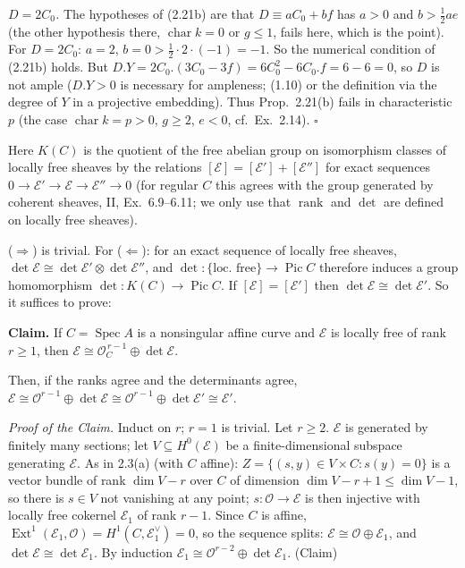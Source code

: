 \documentclass[11pt]{article}
\begin{document}
\emph{$D=2C_0$.} The hypotheses of (2.21b) are that $D\equiv aC_0+bf$ has $a>0$ and $b>\frac12ae$ (the other hypothesis there, $\operatorname{char}k=0$ or $g\le1$, fails here, which is the point). For $D=2C_0$: $a=2$, $b=0>\frac12\cdot2\cdot(-1)=-1$. So the numerical condition of (2.21b) holds. But $D.Y=2C_0.(3C_0-3f)=6C_0^2-6C_0.f=6-6=0$, so $D$ is not ample ($D.Y>0$ is necessary for ampleness; (1.10) or the definition via the degree of $Y$ in a projective embedding). Thus Prop.~2.21(b) fails in characteristic $p$ (the case $\operatorname{char}k=p>0$, $g\ge2$, $e<0$, cf.\ Ex.~2.14). \hfill$\square$

\pf
Here $K(C)$ is the quotient of the free abelian group on isomorphism classes of locally free sheaves by the relations $[\mathcal E]=[\mathcal E']+[\mathcal E'']$ for exact sequences $0\to\mathcal E'\to\mathcal E\to\mathcal E''\to0$ (for regular $C$ this agrees with the group generated by coherent sheaves, II, Ex.~6.9--6.11; we only use that $\operatorname{rank}$ and $\det$ are defined on locally free sheaves).

($\Rightarrow$) is trivial. For ($\Leftarrow$): for an exact sequence of locally free sheaves, $\det\mathcal E\cong\det\mathcal E'\otimes\det\mathcal E''$, and $\det\colon\{\text{loc.\ free}\}\to\operatorname{Pic}C$ therefore induces a group homomorphism $\det\colon K(C)\to\operatorname{Pic}C$. If $[\mathcal E]=[\mathcal E']$ then $\det\mathcal E\cong\det\mathcal E'$. So it suffices to prove:

\textbf{Claim.} If $C=\operatorname{Spec}A$ is a nonsingular affine curve and $\mathcal E$ is locally free of rank $r\ge1$, then $\mathcal E\cong\mathcal O_C^{\,r-1}\oplus\det\mathcal E$.

Then, if the ranks agree and the determinants agree, $\mathcal E\cong\mathcal O^{r-1}\oplus\det\mathcal E\cong\mathcal O^{r-1}\oplus\det\mathcal E'\cong\mathcal E'$.

\emph{Proof of the Claim.} Induct on $r$; $r=1$ is trivial. Let $r\ge2$. $\mathcal E$ is generated by finitely many sections; let $V\subseteq H^0(\mathcal E)$ be a finite-dimensional subspace generating $\mathcal E$. As in 2.3(a) (with $C$ affine): $Z=\{(s,y)\in V\times C:s(y)=0\}$ is a vector bundle of rank $\dim V-r$ over $C$ of dimension $\dim V-r+1\le\dim V-1$, so there is $s\in V$ not vanishing at any point; $s\colon\mathcal O\to\mathcal E$ is then injective with locally free cokernel $\mathcal E_1$ of rank $r-1$. Since $C$ is affine, $\operatorname{Ext}^1(\mathcal E_1,\mathcal O)=H^1(C,\mathcal E_1^\vee)=0$, so the sequence splits: $\mathcal E\cong\mathcal O\oplus\mathcal E_1$, and $\det\mathcal E\cong\det\mathcal E_1$. By induction $\mathcal E_1\cong\mathcal O^{r-2}\oplus\det\mathcal E_1$. \hfill(Claim)
\end{document}
